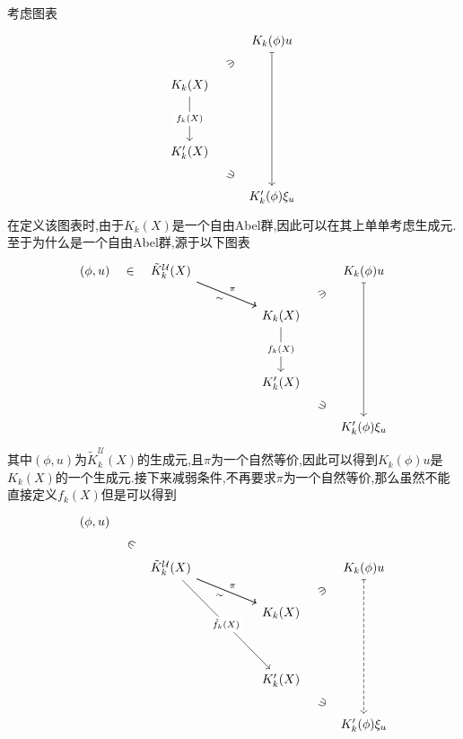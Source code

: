 \documentclass{article}
\begin{document}
\begin{remark}
    考虑图表
    \[\begin{tikzcd}
        & {K_k(\phi)u} \\
        {K_k(X)} \\
        \\
        {K_k'(X)} \\
        & {K_k'(\phi)\xi_u}
        \arrow["\ni"{marking}, draw=none, from=1-2, to=2-1]
        \arrow["{f_k(X)}"{description}, from=2-1, to=4-1]
        \arrow["\ni"{marking}, draw=none, from=5-2, to=4-1]
        \arrow[maps to, from=1-2, to=5-2]
    \end{tikzcd}\]
    在定义该图表时,由于$K_k(X)$是一个自由Abel群,因此可以在其上单单考虑生成元.至于为什么是一个自由Abel群,源于以下图表
    \[\begin{tikzcd}
        {(\phi,u)} & {\tilde{K}^\mathcal{U}_k(X)} &&& {K_k(\phi)u} \\
        &&& {K_k(X)} \\
        \\
        &&& {K_k'(X)} \\
        &&&& {K_k'(\phi)\xi_u}
        \arrow["\ni"{marking}, draw=none, from=1-5, to=2-4]
        \arrow["{f_k(X)}"{description}, from=2-4, to=4-4]
        \arrow["\ni"{marking}, draw=none, from=5-5, to=4-4]
        \arrow[maps to, from=1-5, to=5-5]
        \arrow["\pi", from=1-2, to=2-4]
        \arrow["\sim"', from=1-2, to=2-4]
        \arrow["\in"{marking}, draw=none, from=1-1, to=1-2]
    \end{tikzcd}\]
    其中$(\phi,u)$为$\tilde{K}_k^\mathcal{U}(X)$的生成元,且$\pi$为一个自然等价,因此可以得到$K_k(\phi)u$是$K_k(X)$的一个生成元.接下来减弱条件,不再要求$\pi$为一个自然等价,那么虽然不能直接定义$f_k(X)$但是可以得到
    \[\begin{tikzcd}
        {(\phi,u)} \\
        & {\tilde{K}^\mathcal{U}_k(X)} &&& {K_k(\phi)u} \\
        &&& {K_k(X)} \\
        \\
        &&& {K_k'(X)} \\
        &&&& {K_k'(\phi)\xi_u}
        \arrow["\ni"{marking}, draw=none, from=2-5, to=3-4]
        \arrow["\ni"{marking}, draw=none, from=6-5, to=5-4]
        \arrow[dashed, maps to, from=2-5, to=6-5]
        \arrow["\pi", from=2-2, to=3-4]
        \arrow["\sim"', from=2-2, to=3-4]
        \arrow["{\tilde{f}_k(X)}"{description}, from=2-2, to=5-4]
        \arrow["\in"{marking}, draw=none, from=1-1, to=2-2]

\end{tikzcd}\]
\end{remark}
\end{document}
